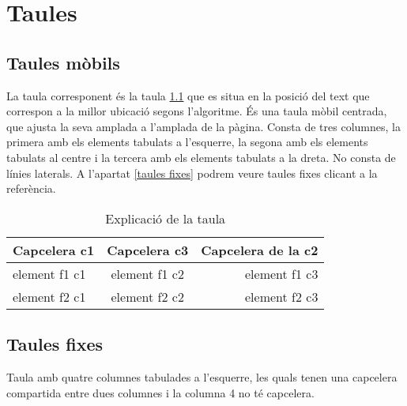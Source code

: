 \chapter{ Taules}
\section{Taules mòbils}
La taula corresponent és la taula \ref{tab:taula1} que es situa en la posició del text que correspon a la millor ubicació segons l'algoritme. 
És una taula mòbil centrada, que ajusta la seva amplada a l'amplada de la pàgina. Consta de tres columnes, la primera amb els elements tabulats a l'esquerre, la segona amb els elements tabulats al centre i la tercera amb els elements tabulats a la dreta. No consta de línies laterals. A l'apartat \ref{taules fixes} podrem veure taules fixes clicant a la referència.

\begin{table}[tbh]
  \centering
  \begin{tabular}{l|c|r}%
    \hline %
    \textbf{Capcelera c1}  & \textbf{Capcelera c3}  & \textbf{Capcelera de la c2} \\
    \hline
    element f1 c1  & element f1 c2  & element f1 c3 \\
    element f2 c1  & element f2 c2  & element f2 c3 \\
    \hline
  \end{tabular}
  \caption{Explicació de la taula}
  \label{tab:taula1}
\end{table}


\section{Taules fixes}
Taula amb quatre columnes tabulades a l'esquerre, les quals tenen una capcelera compartida entre dues columnes i la columna 4 no té capcelera.

\label{taules fixes}
\begin{center}
\end{center}
